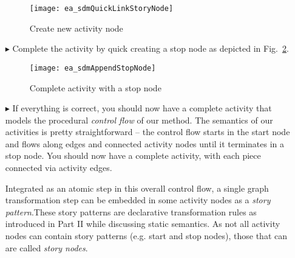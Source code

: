 \begin{itemize}
\begin{figure}[htp]
\begin{center}
  \texttt{[image: ea\_sdmQuickLinkStoryNode]}
  \caption{Create new activity node}  
  \label{fig:sdm_new_activity_node}
\end{center}
\end{figure}

\item[$\blacktriangleright$] Complete the activity by quick creating a stop node as depicted in Fig.~\ref{fig:sdm_stop_node}.

\begin{figure}[htp]
\begin{center}
  \texttt{[image: ea\_sdmAppendStopNode]}
  \caption{Complete activity with a stop node}  
  \label{fig:sdm_stop_node}
\end{center}
\end{figure}

\item[$\blacktriangleright$] If everything is correct, you should now have a complete activity that models the procedural \emph{control flow} of our method. 
The semantics of our activities is pretty straightforward -- the control flow starts in the start node and flows along edges and connected activity nodes until
it terminates in a stop node. You should now have a complete activity, with each piece connected via activity edges.

% 

\label{story-pattern}
Integrated as an atomic step in this overall control flow, a single graph transformation step can be embedded in some activity nodes as a
\emph{story pattern}.These story patterns are declarative transformation rules as introduced in Part II while discussing static
semantics. As not all activity nodes can contain story patterns (e.g. start and stop nodes), those that can are called \emph{story nodes}.


\end{itemize}
